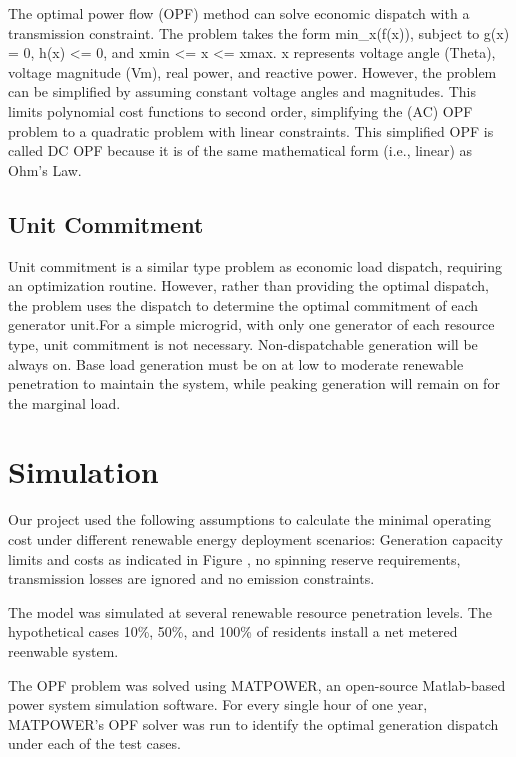 \documentclass[a4paper]{article}
\begin{document}
The optimal power flow (OPF) method can solve economic dispatch with a transmission constraint. The problem takes the form min\_x(f(x)), subject to g(x) = 0, h(x) <= 0, and xmin <= x <= xmax. x represents voltage angle (Theta), voltage magnitude (Vm), real power, and reactive power. However, the problem can be simplified by assuming constant voltage angles and magnitudes. This limits polynomial cost functions to second order, simplifying the (AC) OPF problem to a quadratic problem with linear constraints. This simplified OPF is called DC OPF because it is of the same mathematical form (i.e., linear) as Ohm’s Law.

\subsection{Unit Commitment}

Unit commitment is a similar type problem as economic load dispatch, requiring an optimization routine. However, rather than providing the optimal dispatch, the problem uses the dispatch to determine the optimal commitment of each generator unit.For a simple microgrid, with only one generator of each resource type, unit commitment is not necessary. Non-dispatchable generation will be always on. Base load generation must be on at low to moderate renewable penetration to maintain the system, while peaking generation will remain on for the marginal load.



\section{Simulation}
\label{case}

Our project used the following assumptions to calculate the minimal operating cost under different renewable energy deployment scenarios: Generation capacity limits and costs as indicated in Figure , no spinning reserve requirements, transmission losses are ignored and no emission constraints. 


The model was simulated at several renewable resource penetration levels. The hypothetical cases 10\%, 50\%, and 100\% of residents install a net metered reenwable system. 

The OPF problem was solved using MATPOWER\cite{zimmerman2011matpower}, an open-source Matlab-based power system simulation software. For every single hour of one year, MATPOWER's OPF solver was run to identify the optimal generation dispatch under each of the test cases. 
\end{document}
